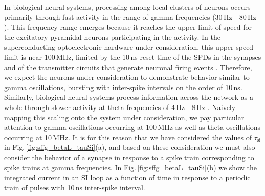 \documentclass[twocolumn]{article}
\begin{document}
In biological neural systems, processing among local clusters of neurons occurs primarily through fast activity in the range of gamma frequencies (30\,Hz - 80\,Hz \cite{budr2004,bu2006}). This frequency range emerges because it reaches the upper limit of speed for the excitatory pyramidal neurons participating in the activity. In the superconducting optoelectronic hardware under consideration, this upper speed limit is near 100\,MHz, limited by the 10\,ns reset time of the SPDs in the synapses and of the transmitter circuits that generate neuronal firing events \cite{sh2018_full}. Therefore, we expect the neurons under consideration to demonstrate behavior similar to gamma oscillations, bursting with inter-spike intervals on the order of 10\,ns. Similarly, biological neural systems process information across the network as a whole through slower activity at theta frequencies of 4\,Hz - 8\,Hz \cite{budr2004,bu2006}. Naively mapping this scaling onto the system under consideration, we pay particular attention to gamma oscillations occurring at 100\,MHz as well as theta oscillations occurring at 10\,MHz. It is for this reason that we have considered the values of $\tau_{\mathrm{si}}$ in Fig.\,\ref{fig:sffg_betaL_tauSi}(a), and based on these consideration we must also consider the behavior of a synapse in response to a spike train corresponding to spike trains at gamma frequencies. In Fig.\,\ref{fig:sffg_betaL_tauSi}(b) we show the integrated current in an SI loop as a function of time in response to a periodic train of pulses with 10\,ns inter-spike interval.

\begin{figure} 
\end{figure}
\end{document}
